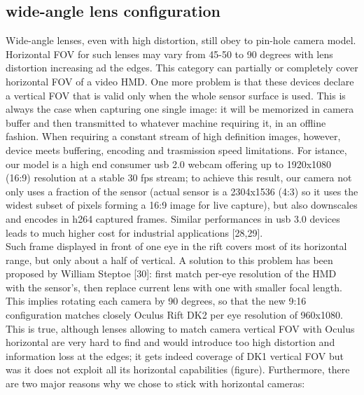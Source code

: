 \subsection{wide-angle lens configuration}
Wide-angle lenses, even with high distortion, still obey to pin-hole camera model. Horizontal FOV for such lenses may vary from 45-50 to 90 degrees with lens distortion increasing ad the edges. This category can partially or completely cover horizontal FOV of a video HMD. One more problem is that these devices declare a vertical FOV that is valid only when the whole sensor surface is used. This is always the case when capturing one single image: it will be memorized in camera buffer and then transmitted to whatever machine requiring it, in an offline fashion. When requiring a constant stream of high definition images, however, device meets buffering, encoding and trasmission speed limitations. For istance, our model is a high end consumer usb 2.0 webcam offering up to 1920x1080 (16:9) resolution at a stable 30 fps stream; to achieve this result, our camera not only uses a fraction of the sensor (actual sensor is a 2304x1536 (4:3) so it uses the widest subset of pixels forming a 16:9 image for live capture), but also downscales and encodes in h264 captured frames. Similar performances in usb 3.0 devices leads to much higher cost for industrial applications [28,29].\\
Such frame displayed in front of one eye in the rift covers most of its horizontal range, but only about a half of vertical. A solution to this problem has been proposed by William Steptoe [30]: first match per-eye resolution of the HMD with the sensor's, then replace current lens with one with smaller focal length. This implies rotating each camera by 90 degrees, so that the new 9:16 configuration matches closely Oculus Rift DK2 per eye resolution of 960x1080. This is true, although lenses allowing to match camera vertical FOV with Oculus horizontal are very hard to find and would introduce too high distortion and information loss at the edges; it gets indeed coverage of DK1 vertical FOV but was it does not exploit all its horizontal capabilities (figure). Furthermore, there are two major reasons why we chose to stick with horizontal cameras:
